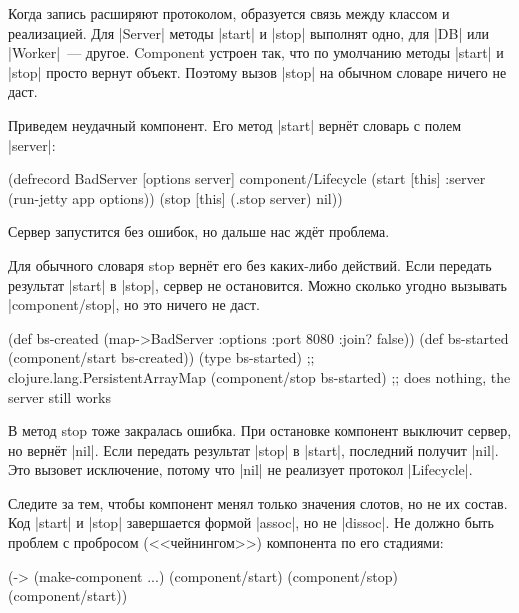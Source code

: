 Когда запись расширяют протоколом, образуется связь между классом и
реализацией. Для \spverb|Server| методы \spverb|start| и \spverb|stop| выполнят
одно, для \spverb|DB| или \spverb|Worker|~--- другое. Component устроен так, что
по умолчанию методы \spverb|start| и \spverb|stop| просто вернут объект. Поэтому
вызов \spverb|stop| на обычном словаре ничего не даст.

Приведем неудачный компонент. Его метод \spverb|start| верн\"{е}т словарь с
полем \spverb|server|:

\begin{english}
  \begin{clojure}
(defrecord BadServer [options server]
  component/Lifecycle
  (start [this]
    {:server (run-jetty app options)})
  (stop [this]
    (.stop server)
    nil))
  \end{clojure}
\end{english}

Сервер запустится без ошибок, но дальше нас жд\"{е}т проблема.

Для обычного словаря stop верн\"{е}т его без каких-либо действий. Если передать
результат \spverb|start| в \spverb|stop|, сервер не остановится. Можно сколько
угодно вызывать \spverb|component/stop|, но это ничего не даст.

\begin{english}
  \begin{clojure}
(def bs-created (map->BadServer
                  {:options {:port 8080 :join? false}}))
(def bs-started (component/start bs-created))
(type bs-started)
;; clojure.lang.PersistentArrayMap
(component/stop bs-started)
;; does nothing, the server still works
  \end{clojure}
\end{english}

В метод stop тоже закралась ошибка. При остановке компонент выключит сервер, но
верн\"{е}т \spverb|nil|. Если передать результат \spverb|stop| в \spverb|start|,
последний получит \spverb|nil|. Это вызовет исключение, потому что \spverb|nil|
не реализует протокол \spverb|Lifecycle|.

Следите за тем, чтобы компонент менял только значения слотов, но не их
состав. Код \spverb|start| и \spverb|stop| завершается формой \spverb|assoc|, но
не \spverb|dissoc|. Не должно быть проблем с пробросом (<<чейнингом>>)
компонента по его стадиями:

\begin{english}
  \begin{clojure}
(-> (make-component {...})
    (component/start)
    (component/stop)
    (component/start))
  \end{clojure}
\end{english}

